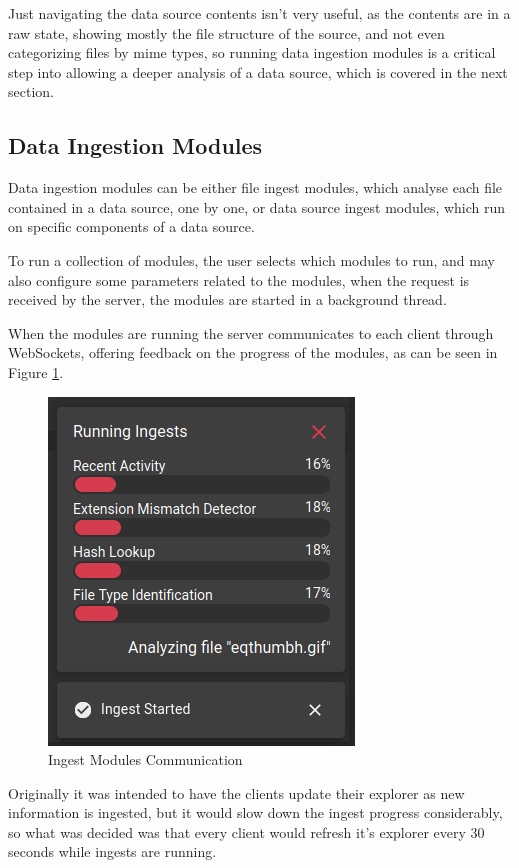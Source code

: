 Just navigating the data source contents isn't very useful, as the contents are in a raw state, showing mostly the file structure of the source, and not even categorizing files by mime types, so running data
ingestion modules is a critical step into allowing a deeper analysis of a data source, which is covered in the next section.

\subsection{Data Ingestion Modules}

Data ingestion modules can be either file ingest modules, which analyse each file contained in a data source, one by one,
or data source ingest modules, which run on specific components of a data source.

To run a collection of modules, the user selects which modules to run, and may also configure some parameters related to the modules, when the request is received by the server, the modules are started in a background thread.

When the modules are running the server communicates to each client through WebSockets, offering feedback on the progress of the modules, as can be seen in Figure \ref{fig:modules}.

\begin{figure}[ht]
 \centering
 \includegraphics[width=0.55\linewidth]{imgs/modules.png}
 \caption{Ingest Modules Communication}
 \label{fig:modules}
\end{figure}

Originally it was intended to have the clients update their explorer as new information is ingested, but it would slow down the ingest progress considerably, so what was decided was that every client would refresh 
it's explorer every 30 seconds while ingests are running.

